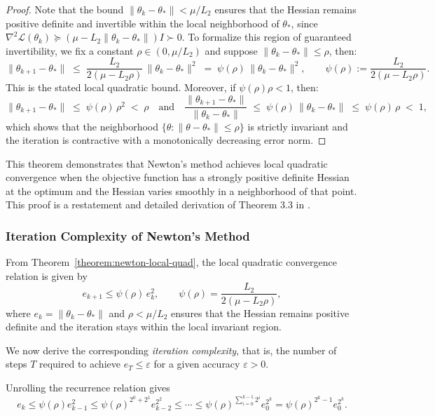 \documentclass{article}
\theoremstyle{plain}
\theoremstyle{definition}
\theoremstyle{remark}
\begin{document}
\begin{proof}
Note that the bound $\|\theta_k - \theta_*\| < \mu/L_2$ ensures that the Hessian remains
positive definite and invertible within the local neighborhood of $\theta_*$,
since $\nabla^2 \mathcal{L}(\theta_k) \succeq (\mu - L_2\|\theta_k-\theta_*\|)I \succ 0$. 
To formalize this region of guaranteed invertibility, we fix a constant
$\rho \in (0, \mu/L_2)$ and suppose $\|\theta_k-\theta_*\|\le \rho$, then:
\[
\|\theta_{k+1}-\theta_*\|
\;\le\; \frac{L_2}{2(\mu-L_2\rho)}\,\|\theta_k-\theta_*\|^2
\;=\; \psi(\rho)\,\|\theta_k-\theta_*\|^2,
\qquad 
\psi(\rho):=\frac{L_2}{2(\mu-L_2\rho)}.
\]
This is the stated local quadratic bound. Moreover, if $\psi(\rho)\rho<1$, then:
\[
\|\theta_{k+1}-\theta_*\| \;\le\; \psi(\rho)\,\rho^2 \;<\; \rho
\quad\text{and}\quad
\frac{\|\theta_{k+1}-\theta_*\|}{\|\theta_k-\theta_*\|} \;\le\; \psi(\rho)\,\|\theta_k-\theta_*\| 
\;\le\; \psi(\rho)\,\rho \;<\; 1,
\]
which shows that the neighborhood $\{\theta:\|\theta-\theta_*\|\le \rho\}$ is strictly invariant and the iteration is
contractive with a monotonically decreasing error norm. 
\end{proof}
This theorem demonstrates that Newton's method achieves local quadratic convergence when the objective function has a strongly positive definite Hessian at the optimum and the Hessian varies smoothly in a neighborhood of that point. This proof is a restatement and detailed derivation of Theorem 3.3 in \citet{zhang2023notes}.


\subsubsection{Iteration Complexity of Newton’s Method}

From Theorem~\ref{theorem:newton-local-quad}, the local quadratic convergence relation is given by
\[
e_{k+1} \le \psi(\rho)\, e_k^2,
\qquad
\psi(\rho) = \frac{L_2}{2(\mu - L_2\rho)},
\]
where $e_k = \|\theta_k - \theta_*\|$ and $\rho < \mu/L_2$ ensures that the Hessian remains positive definite and the iteration stays within the local invariant region.

We now derive the corresponding \emph{iteration complexity}, that is, the number of steps $T$ required to achieve $e_T \le \varepsilon$ for a given accuracy $\varepsilon > 0$.

Unrolling the recurrence relation gives
\[
e_k 
\leq \psi(\rho)e_{k-1}^2 
\leq \psi(\rho)^{2^0 + 2^1} e_{k-2}^{2^2}
\leq \cdots
\leq \psi(\rho)^{\sum_{i=0}^{k-1} 2^i} e_0^{2^k}
= \psi(\rho)^{2^k - 1} e_0^{2^k}.
\]
\end{document}
